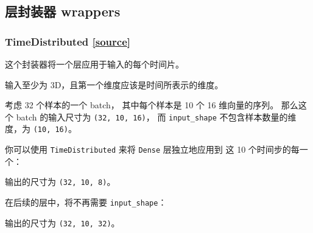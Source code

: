 
\subsection{层封装器 wrappers  }
\subsubsection{TimeDistributed {\href{https://github.com/keras-team/keras/blob/master/keras/layers/wrappers.py\#L104}{{[}source{]}}}}

\begin{Shaded}
\begin{Highlighting}[]
\end{Highlighting}
\end{Shaded}

这个封装器将一个层应用于输入的每个时间片。

输入至少为 3D，且第一个维度应该是时间所表示的维度。

考虑 32 个样本的一个 batch， 其中每个样本是 10 个 16 维向量的序列。
那么这个 batch 的输入尺寸为 \texttt{(32,\ 10,\ 16)}， 而
\texttt{input\_shape} 不包含样本数量的维度，为 \texttt{(10,\ 16)}。

你可以使用 \texttt{TimeDistributed} 来将 \texttt{Dense} 层独立地应用到
这 10 个时间步的每一个：

\begin{Shaded}
\begin{Highlighting}[]
\OperatorTok{=} 
\OperatorTok{=}\NormalTok{(}\NormalTok{, }\NormalTok{)))}
\end{Highlighting}
\end{Shaded}

输出的尺寸为 \texttt{(32,\ 10,\ 8)}。

在后续的层中，将不再需要 \texttt{input\_shape}：

\begin{Shaded}
\begin{Highlighting}[]
\NormalTok{)))}
\end{Highlighting}
\end{Shaded}

输出的尺寸为 \texttt{(32,\ 10,\ 32)}。


